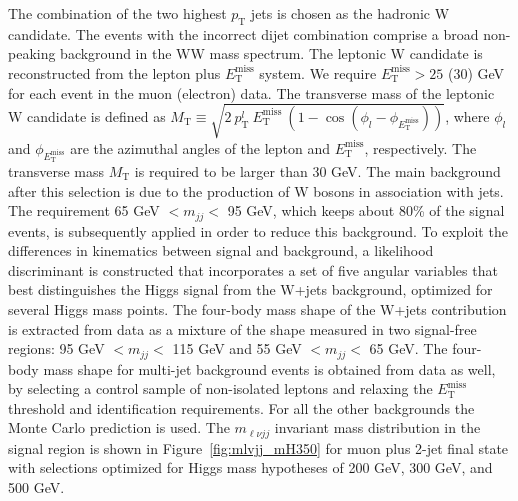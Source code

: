 \documentclass{PoS}
\newcommand{\pt}{\ensuremath{p_\mathrm{T}}}
\newcommand{\ETm}{\ensuremath{E_{\mathrm{T}}^{\mathrm{miss}}}}
\newcommand{\MET}{\ETm}
\newcommand{\MT}{\ensuremath{M_\mathrm{T}}}
\begin{document}
The combination of the two highest $\pt$ jets is chosen as the
hadronic W candidate.  The events with the incorrect dijet combination
comprise a broad non-peaking background in the WW mass spectrum.  The
leptonic W candidate is reconstructed from the lepton plus $\MET$
system. We require $\MET>25$ (30) GeV for each event in the muon
(electron) data.  The transverse mass of the leptonic W candidate is
defined as {\small $\MT \equiv
  \sqrt{2~p_\mathrm{T}^l~\MET~(1-\cos(\phi_l-\phi_{\MET}))}$}, where
$\phi_l$ and $\phi_{\MET}$ are the azimuthal angles of the lepton and
$\MET$, respectively.  The transverse mass $\MT$ is required to be
larger than 30 GeV.  The main background after this selection is due
to the production of W bosons in association with jets.  The
requirement 65 GeV $< m_{jj} <$ 95 GeV, which keeps about 80\% of the
signal events, is subsequently applied in order to reduce this
background.  To exploit the differences in kinematics between signal
and background, a likelihood discriminant is constructed that
incorporates a set of five angular variables that best distinguishes
the Higgs signal from the W+jets background, optimized for several
Higgs mass points.  The four-body mass shape of the W+jets
contribution is extracted from data as a mixture of the shape measured
in two signal-free regions: 95 GeV $<m_{jj}<$ 115 GeV and 55 GeV
$<m_{jj}<$ 65 GeV.  The four-body mass shape for multi-jet background
events is obtained from data as well, by selecting a control sample of
non-isolated leptons and relaxing the $\MET$ threshold and
identification requirements.  For all the other backgrounds the Monte
Carlo prediction is used.  The $m_{\ell\nu{}jj}$ invariant mass
distribution in the signal region is shown in
Figure~\ref{fig:mlvjj_mH350} for muon plus 2-jet final state with
selections optimized for Higgs mass hypotheses of 200 GeV, 300 GeV,
and 500 GeV.
%
\end{document}
